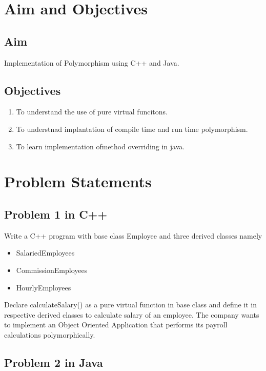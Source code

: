\documentclass[11pt]{article}
\begin{document}
\tableofcontents
\thispagestyle{empty}
\clearpage


\setcounter{page}{1}

\section{Aim and Objectives}
\subsection*{Aim}
Implementation of Polymorphism using C++ and Java.

\subsection*{Objectives}
\begin{enumerate}
	\item To understand the use of pure virtual funcitons. 
	\item To understnad implantation of compile time and run time polymorphism.
	\item To learn implementation ofmethod overriding in java. 
\end{enumerate}

\section{Problem Statements}
\subsection{Problem 1 in C++}

Write a C++ program with base class Employee and three derived classes namely
\begin{itemize}
	\item SalariedEmployees
	\item CommissionEmployees
	\item HourlyEmployees
\end{itemize}

Declare calculateSalary() as a pure virtual function in base class and define it in respective
derived classes to calculate salary of an employee.
The company wants to implement an Object Oriented Application that performs its payroll
calculations polymorphically.


\subsection{Problem 2 in Java}
\end{document}

